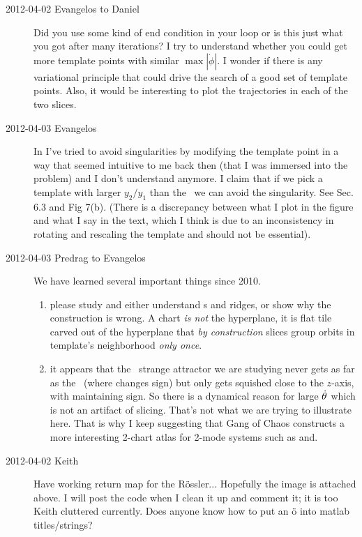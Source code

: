 \begin{description}
\item[2012-04-02 Evangelos to Daniel] Did you use some kind of end condition in
your loop or is this just what you got after many iterations? I try to understand
whether you could get more template points with similar $\max |\dot{\phi}|$.
I wonder if there is any variational principle that could drive the search of
a good set of template points.
Also, it would be interesting to plot the trajectories in each of the two slices.

\item[2012-04-03 Evangelos]
In  I've tried to avoid singularities by modifying the
template point in a way that seemed intuitive to me back then (that I was immersed
into the problem) and I don't understand anymore. I claim that if we pick a template
with larger $y_2/y_1$ than the \reqv\ we can avoid
the singularity. See Sec. 6.3 and Fig 7(b).
(There is a discrepancy between what I plot in the figure and what I say in the
text, which I think is due to an inconsistency in rotating and rescaling the
template and should not be essential).

\item[2012-04-03 Predrag to Evangelos] We have learned several important things since
2010.
\begin{enumerate}
  \item
    please study and either understand \chartBord s and ridges, or show
    why the construction is wrong. A chart \emph{is not} the hyperplane,
    it is flat tile carved out of the hyperplane that \emph{by construction}
    slices group orbits in template's neighborhood \emph{only once}.
  \item
    it appears that the \cLe\ strange attractor we are studying never
    gets as far as the \chartBord\ (where  changes
    sign) but only gets squished close to the $z$-axis, with
     maintaining sign. So there is a dynamical reason
    for large $\dot{\theta}$ which is not an artifact of slicing. That's
    not what we are trying to illustrate here. That is why I keep
    suggesting that Gang of Chaos constructs a more interesting 2-chart
    atlas for 2-mode systems such as  and.
\end{enumerate}


\item[2012-04-02 Keith] Have working return map for the
R\"ossler... Hopefully the image is attached above.  I will post the code
when I clean it up and comment it; it is too Keith cluttered currently.
Does anyone know how to put an \"o into matlab titles/strings?


\end{description}
